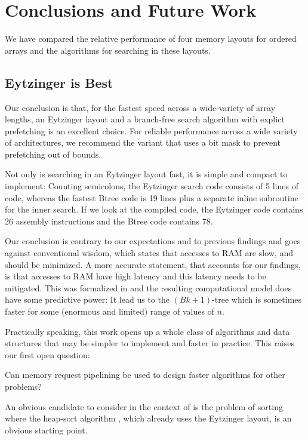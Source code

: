 \documentclass{patmorin}
\begin{document}
\section{Conclusions and Future Work}

We have compared the relative performance of four memory layouts for
ordered arrays and the algorithms for searching in these layouts.

\subsection{Eytzinger is Best}
Our conclusion is that, for the fastest speed across a wide-variety of
array lengths, an Eytzinger layout and a branch-free search algorithm with
explict prefetching is an excellent choice.  For reliable performance
across a wide variety of architectures, we recommend the variant that
uses a bit mask to prevent prefetching out of bounds.

Not only is searching in an Eytzinger layout fast, it is simple and
compact to implement: Counting semicolons, the Eytzinger search code
consists of 5 lines of code, whereas the fastest Btree code is 19 lines
plus a separate inline subroutine for the inner search.  If we look at
the compiled code, the Eytzinger code contains 26 assembly instructions
and the Btree code contains 78.

Our conclusion is contrary to our expectations and to previous findings
and goes against conventional wisdom, which states that accesses to
RAM are slow, and should be minimized.  A more accurate statement, that
accounts for our findings, is that accesses to RAM have high latency and
this latency needs to be mitigated.  This was formalized in 
and the resulting computational model does have some predictive power:
It lead us to the $(Bk+1)$-tree which is sometimes faster for some
(enormous and limited) range of values of $n$.

Practically speaking, this work opens up a whole class of algorithms
and data structures that may be simpler to implement and faster in
practice.  This raises our first open question:

\begin{op}
  Can memory request pipelining be used to design faster algorithms for
  other problems?
\end{op}

An obvious candidate to consider in the context of 
is the problem of sorting where the heap-sort algorithm
\cite{floyd:algorithm,williams:algorithm}, which already uses the
Eytzinger layout, is an obvious starting point.
\end{document}
